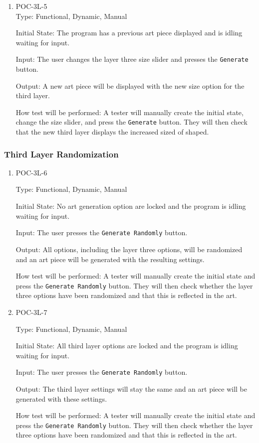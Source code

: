 \documentclass[12pt, titlepage]{article}
\begin{document}
\begin{enumerate}
\item{POC-3L-5}\\
Type: Functional, Dynamic, Manual

Initial State: The program has a previous art piece displayed and is idling waiting for input.

Input: The user changes the layer three size slider and presses the \texttt{Generate} button.

Output: A new art piece will be displayed with the new size option for the third layer.

How test will be performed: A tester will manually create the initial state, change the size slider, and press the \texttt{Generate} button. They will then check that the new third layer displays the increased sized of shaped.

\setcounter{enumTemp}{\theenumi}
\end{enumerate}

\subsubsection{Third Layer Randomization}

\begin{enumerate}
\setcounter{enumi}{\theenumTemp}

\item{POC-3L-6}

Type: Functional, Dynamic, Manual

Initial State: No art generation option are locked and the program is idling waiting for input.

Input: The user presses the \texttt{Generate Randomly} button.

Output: All options, including the layer three options, will be randomized and an art piece will be generated with the resulting settings.

How test will be performed: A tester will manually create the initial state and press the \texttt{Generate Randomly} button. They will then check whether the layer three options have been randomized and that this is reflected in the art.

\item{POC-3L-7}

Type: Functional, Dynamic, Manual

Initial State: All third layer options are locked and the program is idling waiting for input.

Input: The user presses the \texttt{Generate Randomly} button.

Output: The third layer settings will stay the same and an art piece will be generated with these settings.

How test will be performed: A tester will manually create the initial state and press the \texttt{Generate Randomly} button. They will then check whether the layer three options have been randomized and that this is reflected in the art.

\end{enumerate}
	
\end{document}
